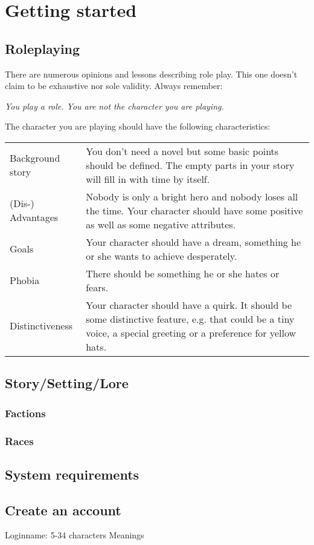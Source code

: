 \documentclass[a4paper,11pt]{scrreprt}
\begin{document}
\chapter{Getting started}
\section{Roleplaying}
There are numerous opinions and lessons describing role play. This one doesn’t claim to be exhaustive nor sole validity. Always remember:
\begin{center}
\emph{You play a role. You are not the character you are playing.}
\end{center}
The character you are playing should have the following characteristics: 
\begin{table}[h]
\begin{tabular}{ l p{12.5cm}}
Background story & You don’t need a novel but some basic points should be 
defined. The empty parts in your story will fill in with time by 
itself. \\
(Dis-) Advantages & Nobody is only a bright hero and nobody loses all the 
time. Your character should have some positive as well as some negative attributes. \\
Goals & Your character should have a dream, something he or she 
wants to achieve desperately. \\
Phobia & There should be something he or she hates or fears. \\
Distinctiveness & Your character should have a quirk. It should be some distinctive feature, e.g. that could be a tiny voice, a 
special greeting or a preference for yellow hats. 
\end{tabular}
\end{table}
\section{Story/Setting/Lore}
\subsection{Factions}
\subsection{Races}
\section{System requirements}
\section{Create an account}
Loginname: 5-34 characters
Meanings
\end{document}
